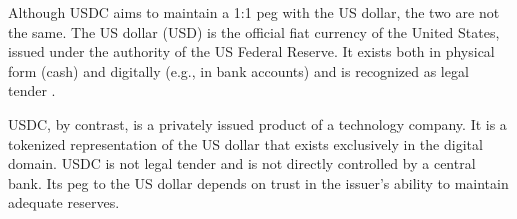 Although USDC aims to maintain a 1:1 peg with the US dollar, the two are not the same.
The US dollar (USD) is the official fiat currency of the United States, issued under the authority of the US Federal Reserve.
It exists both in physical form (cash) and digitally (e.g., in bank accounts) and is recognized as legal tender \cite{usdc-2}.


USDC, by contrast, is a privately issued product of a technology company.
It is a tokenized representation of the US dollar that exists exclusively in the digital domain.
USDC is not legal tender and is not directly controlled by a central bank.
Its peg to the US dollar depends on trust in the issuer’s ability to maintain adequate reserves.


